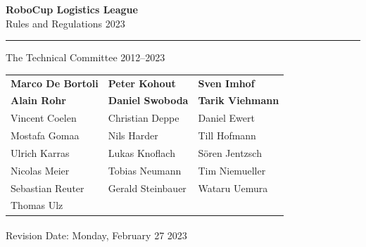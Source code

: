 \documentclass[12pt,twoside]{article}
\begin{document}
\hypersetup{pageanchor=false}


\begin{titlepage}
  \vspace*{5cm}
  \begin{center}
    \begin{LARGE}

      {\bf RoboCup Logistics League}\\[2ex]
      {\Large Rules and Regulations 2023}\\[4ex]
    \end{LARGE}
    \hrule

    {\LARGE\vspace*{4ex}}
    \begin{Large}
      The Technical Committee 2012--2023\\[6ex]
    \end{Large}
    \begin{tabular}{lll}
      \textbf{Marco De Bortoli}&
      \textbf{Peter Kohout}&
      \textbf{Sven Imhof}\\
      \textbf{Alain Rohr}&
      \textbf{Daniel Swoboda}&
      \textbf{Tarik Viehmann}\\[.5em]
      Vincent Coelen
      &Christian Deppe
      &Daniel Ewert
      \\
      Mostafa Gomaa
      &Nils Harder
      &Till Hofmann
      \\
      Ulrich Karras
      &Lukas Knoflach
      &S\"oren Jentzsch
      \\
      Nicolas Meier
      &Tobias Neumann
      &Tim Niemueller
      \\
      Sebastian Reuter
      &Gerald Steinbauer
      &Wataru Uemura
      \\
      Thomas Ulz
      \\
    \end{tabular}
    \vfill
    Revision Date: Monday, February 27\textsuperscript{}
    2023
  \end{center}
\end{titlepage}
\thispagestyle{empty}
\pagebreak
\clearpage

\hypersetup{pageanchor=true}
\setcounter{page}{1}
\tableofcontents
\newpage
\cleardoublepage{}
\end{document}
